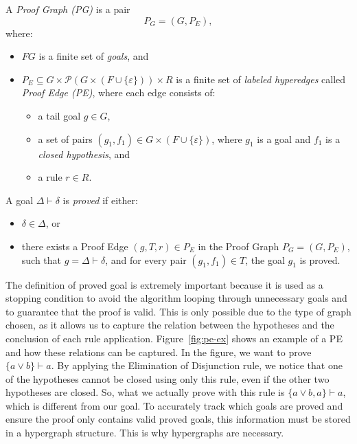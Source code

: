 \begin{definition}
A \emph{Proof Graph (PG)} is a pair
\[
P_G = (G, P_E),
\]
where:
\begin{itemize}
  \item \( FG \) is a finite set of \emph{goals}, and
  \item \( P_E \subseteq G \times \mathcal{P}(G \times (F \cup \{\varepsilon\})) \times R \) is a finite set of \emph{labeled hyperedges} called \emph{Proof Edge (PE)}, where each edge consists of:
  \begin{itemize}
    \item a tail goal \( g \in G \),
    \item a set of pairs \( (g_1, f_1) \in G \times (F \cup \{\varepsilon\}) \), where \( g_1 \) is a goal and \( f_1 \) is a \emph{closed hypothesis}, and
    \item a rule \( r \in R \).
  \end{itemize}
\end{itemize}
\end{definition}

\begin{definition}
A goal \( \Delta \vdash \delta \) is \emph{proved} if either:
\begin{itemize}
  \item \( \delta \in \Delta \), or
  \item there exists a Proof Edge \( (g, T, r) \in P_E \) in the Proof Graph \( P_G = (G, P_E) \), such that \( g = \Delta \vdash \delta \), and for every pair \( (g_1, f_1) \in T \), the goal \( g_1 \) is proved.
\end{itemize}
\end{definition}

The definition of proved goal is extremely important because it is used as a stopping condition to avoid the algorithm looping through unnecessary goals and to guarantee that the proof is valid. This is only possible due to the type of graph chosen, as it allows us to capture the relation between the hypotheses and the conclusion of each rule application. Figure~\ref{fig:pe-ex} shows an example of a PE and how these relations can be captured. In the figure, we want to prove \(\{a \vee b\} \vdash a\). By applying the Elimination of Disjunction rule, we notice that one of the hypotheses cannot be closed using only this rule, even if the other two hypotheses are closed. So, what we actually prove with this rule is \(\{a \vee b, a\} \vdash a\), which is different from our goal. To accurately track which goals are proved and ensure the proof only contains valid proved goals, this information must be stored in a hypergraph structure. This is why hypergraphs are necessary.

